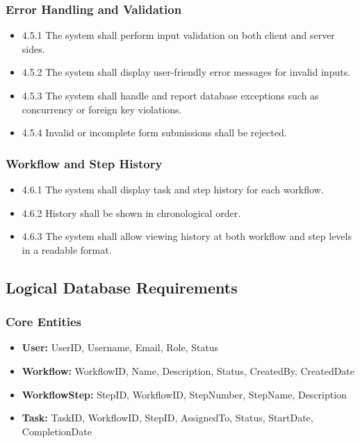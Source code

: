 \documentclass[12pt]{article}
\begin{document}
\subsubsection{Error Handling and Validation}
\begin{itemize}
    \item 4.5.1 The system shall perform input validation on both client and server sides.
    \item 4.5.2 The system shall display user-friendly error messages for invalid inputs.
    \item 4.5.3 The system shall handle and report database exceptions such as concurrency or
    foreign key violations.
    \item 4.5.4 Invalid or incomplete form submissions shall be rejected.
\end{itemize}

\subsubsection{Workflow and Step History}
\begin{itemize}
    \item 4.6.1 The system shall display task and step history for each workflow.
    \item 4.6.2 History shall be shown in chronological order.
    \item 4.6.3 The system shall allow viewing history at both workflow and step levels in a
    readable format.
\end{itemize}

\subsection{Logical Database Requirements}

\subsubsection{Core Entities}
\begin{itemize}
    \item \textbf{User:} UserID, Username, Email, Role, Status
    \item \textbf{Workflow:} WorkflowID, Name, Description, Status, CreatedBy, CreatedDate
    \item \textbf{WorkflowStep:} StepID, WorkflowID, StepNumber, StepName, Description
    \item \textbf{Task:} TaskID, WorkflowID, StepID, AssignedTo, Status, StartDate,
    CompletionDate
\end{itemize}
\end{document}

